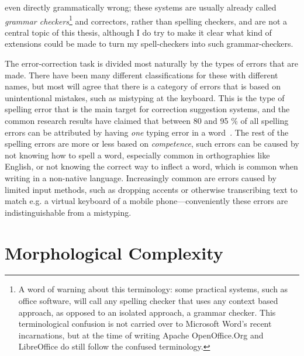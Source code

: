 \documentclass[officiallayout]{unihelcompling}
\begin{document}
even directly grammatically wrong; these systems are usually already called
\emph{grammar checkers}\footnote{A word of warning about this terminology:
    some practical systems, such as office software, will call any spelling
    checker that uses any context based approach, as opposed to an isolated
    approach, a grammar checker. This terminological confusion is not carried
over to Microsoft Word's recent incarnations, but at the time of writing Apache
OpenOffice.Org and LibreOffice do still follow the confused terminology.} and
correctors, rather than spelling checkers, and are not a central topic of this
thesis, although I do try to make it clear what kind of extensions could be
made to turn my spell-checkers into such grammar-checkers.

The error-correction task is divided most naturally by the types of errors that
are made. There have been many different classifications for these with
different names, but most will agree that there is a
category of errors that is based on unintentional mistakes, such as
mistyping at the keyboard. This is the type of spelling error that is the
main target for correction suggestion systems, and the common
research results have claimed that between 80 and 95 \% of all spelling
errors can be attributed by having \emph{one} typing error in a 
word~\citep{kukich1992techniques}. The rest of the spelling errors are more
or less based on \emph{competence}, such errors can be caused by not knowing
how to spell a word, especially common in orthographies like English, or not
knowing the correct way to inflect a word, which is common when writing in a
non-native language. Increasingly common are errors caused by limited input
methods, such as dropping accents or otherwise transcribing text to match e.g.
a virtual keyboard of a mobile phone---conveniently these errors are 
indistinguishable from a mistyping.



\section{Morphological Complexity}
\label{sec:morphological-complexity}
\end{document}
